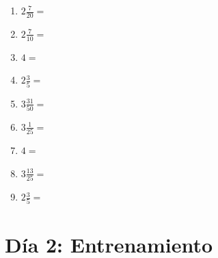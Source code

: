 \documentclass[12pt]{article}
\begin{document}
\begin{enumerate}
\item \large $ 2 \frac{7}{20} = $ \vspace{1.5cm}
\item \large $ 2 \frac{7}{10} = $ \vspace{1.5cm}
\item \large $ 4 = $ \vspace{1.5cm}
\item \large $ 2 \frac{3}{5} = $ \vspace{1.5cm}
\item \large $ 3 \frac{31}{50} = $ \vspace{1.5cm}
\item \large $ 3 \frac{1}{25} = $ \vspace{1.5cm}
\item \large $ 4 = $ \vspace{1.5cm}
\item \large $ 3 \frac{13}{25} = $ \vspace{1.5cm}
\item \large $ 2 \frac{3}{5} = $ \vspace{1.5cm}
\end{enumerate}\newpage
\section*{Día 2: Entrenamiento}
\end{document}
